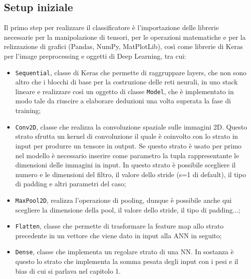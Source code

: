 \subsection{Setup iniziale}
Il primo step per realizzare il classificatore è l’importazione delle librerie necessarie per la manipolazione di tensori, per le operazioni matematiche e per la relizzazione di grafici (Pandas, NumPy, MatPlotLib), così come librerie di Keras per l’image preprocessing e oggetti di Deep Learning, tra cui:
\begin{itemize}
\item \lstinline{Sequential}, classe di Keras che permette di raggruppare layers, che non sono altro che i blocchi di base per la costruzione delle reti neurali, in uno stack lineare e realizzare così un oggetto di classe \lstinline{Model}, che è implementato in modo tale da riuscire a elaborare deduzioni una volta superata la fase di training; 
\item \lstinline{Conv2D}, classe che realizza la convoluzione spaziale sulle immagini 2D. Questo strato sfrutta un kernel di convoluzione il quale è coinvolto con lo strato in input per produrre un tensore in output. Se questo strato è usato per primo nel modello è necessario inserire come parametro la tupla rappresentante le dimensioni delle immagini in input. In questo strato è possibile scegliere il numero e le dimensioni del filtro, il valore dello stride (s=1 di default), il tipo di padding e altri parametri del caso; 
\item \lstinline{MaxPool2D}, realizza l’operazione di pooling, dunque è possibile anche qui scegliere la dimensione della pool, il valore dello stride, il tipo di padding...;
\item \lstinline{Flatten}, classe che permette di trasformare la feature map allo strato precedente in un vettore che viene dato in input alla ANN in seguito;
\item \lstinline{Dense}, classe che implementa un regolare strato di una NN. In sostanza è questo lo strato che implementa la somma pesata degli input con i pesi e il bias di cui si parlava nel capitolo 1. 
\end{itemize}

